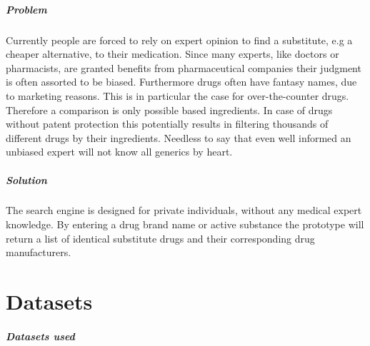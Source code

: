 \documentclass[11pt,titlepage,oneside,openany]{book}
\begin{document}
\paragraph{Problem} \label{sec:problem}
Currently people are forced to rely on expert opinion to find a substitute, e.g a cheaper alternative, to their medication. Since many experts, like doctors or pharmacists, are granted benefits from pharmaceutical companies their judgment is often assorted to be biased.
Furthermore drugs often have fantasy names, due to marketing reasons. This is in particular the case for over-the-counter drugs. Therefore a comparison is only possible based ingredients.
In case of drugs without patent protection this potentially results in filtering thousands of different drugs by their ingredients. Needless to say that even well informed an unbiased expert will not know all generics by heart.



\paragraph{Solution} 
The search engine is designed for private individuals, without any medical expert knowledge.
\label{sec:solution} %
 By entering a drug brand name or active substance the prototype will return a list of identical substitute drugs and their corresponding drug manufacturers.





\chapter{Datasets}
\label{cha:datasets}

\paragraph{Datasets used}
\label{sec:datasets_used}
\end{document}
